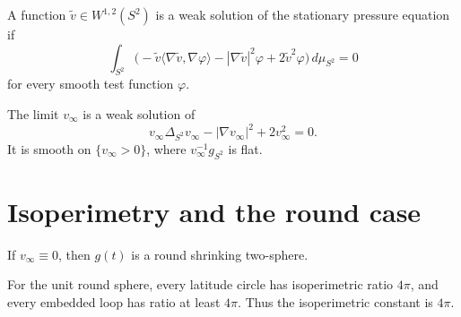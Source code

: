 \begin{definition}
\label{def:chow-iv-weak-stationary-pressure}

A function \(\widetilde v\in W^{1,2}(S^2)\) is a weak solution of the
stationary pressure equation if
\[
 \int_{S^2}\bigl(-\widetilde v\langle\nabla\widetilde v,\nabla\varphi\rangle
 -|\nabla\widetilde v|^2\varphi+2\widetilde v^2\varphi\bigr)
 \,d\mu_{S^2}=0
\]
for every smooth test function \(\varphi\).
\end{definition}

\begin{lemma}
\label{lem:chow-iv-backward-pressure-stationary}


The limit \(v_\infty\) is a weak solution of
\[
 v_\infty\Delta_{S^2}v_\infty-|\nabla v_\infty|^2+2v_\infty^2=0.
\]
It is smooth on \(\{v_\infty>0\}\), where
\(v_\infty^{-1}g_{S^2}\) is flat.
\end{lemma}

\section{Isoperimetry and the round case}

\begin{proposition}
\label{prop:chow-iv-zero-backward-pressure-round}


If \(v_\infty\equiv0\), then \(g(t)\) is a round shrinking two-sphere.
\end{proposition}

\begin{example}
\label{ex:chow-iv-unit-sphere-isoperimetric-constant}

For the unit round sphere, every latitude circle has isoperimetric ratio
\(4\pi\), and every embedded loop has ratio at least \(4\pi\).  Thus the
isoperimetric constant is \(4\pi\).
\end{example}

